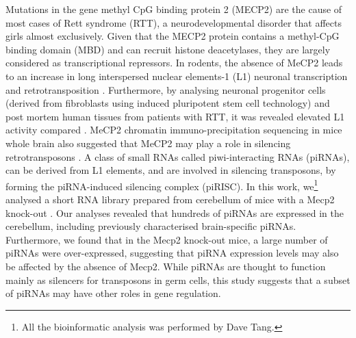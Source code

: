 Mutations in the gene methyl CpG binding protein 2 (MECP2) are the cause of most cases of Rett syndrome (RTT), a neurodevelopmental disorder that affects girls almost exclusively. Given that the MECP2 protein contains a methyl-CpG binding domain (MBD) and can recruit histone deacetylases, they are largely considered as transcriptional repressors. In rodents, the absence of MeCP2 leads to an increase in long interspersed nuclear elements-1 (L1) neuronal transcription and retrotransposition \citep{pmid21085180}. Furthermore, by analysing neuronal progenitor cells (derived from fibroblasts using induced pluripotent stem cell technology) and post mortem human tissues from patients with RTT, it was revealed elevated L1 activity compared \citep{pmid21085180}. MeCP2 chromatin immuno-precipitation sequencing in mice whole brain also suggested that MeCP2 may play a role in silencing retrotransposons \citep{pmid20188665}. A class of small RNAs called piwi-interacting RNAs (piRNAs), can be derived from L1 elements, and are involved in silencing transposons, by forming the piRNA-induced silencing complex (piRISC). In this work, we\footnote{All the bioinformatic analysis was performed by Dave Tang.} analysed a short RNA library prepared from cerebellum of mice with a Mecp2 knock-out \citep{pmid20921386}. Our analyses revealed that hundreds of piRNAs are expressed in the cerebellum, including previously characterised brain-specific piRNAs. Furthermore, we found that in the Mecp2 knock-out mice, a large number of piRNAs were over-expressed, suggesting that piRNA expression levels may also be affected by the absence of Mecp2. While piRNAs are thought to function mainly as silencers for transposons in germ cells, this study suggests that a subset of piRNAs may have other roles in gene regulation.
